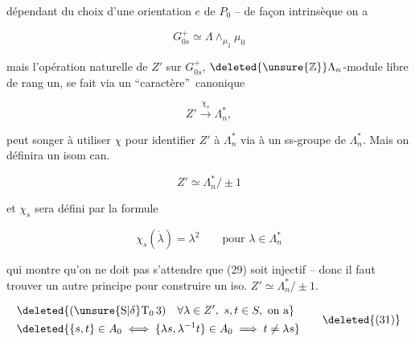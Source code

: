 
dépendant du choix d'une orientation $e$ de $P_0$ -- de façon intrinsèque on a

\[
G_{0s}^+\simeq\Lambda\wedge_{\mu_2}\mu_0\tag*{(28)}
\]


mais l'opération naturelle de $Z'$ sur $G_{0s}^+$, $\deleted{\unsure{\mathbb Z}}\Lambda_n$-module libre de rang un, se fait via un ``caractère''\ canonique

\[
Z'\xrightarrow{\chi_s}\Lambda_n^*,\tag*{(29)}
\]

 peut songer à utiliser $\chi$ pour identifier $Z'$ à $\Lambda_n^*$ via à un ss-groupe de $\Lambda_n^*$. Mais  on définira un isom can.

\[
Z'\simeq\Lambda_n^*/\pm1
\]

et $\chi_s$ sera défini par la formule

\[
\chi_s(\dot\lambda)=\lambda^2\qquad\text{pour }\lambda\in\Lambda_n^*\tag*{(30)}
\]


qui montre qu'on ne doit pas s'attendre que (29) soit injectif -- donc il faut trouver un autre principe pour construire un iso. $Z'\simeq\Lambda_n^*/\pm1$.


\[
\begin{aligned}
 &\deleted{(\unsure{\mathrm S|\delta}\mathrm T_0\,3)\quad\forall\lambda\in Z',\ s,t\in S,\ \text{on a}}\\
 &\deleted{\{s,t\}\in A_0\iff\{\lambda s,\lambda^{-1}t\}\in A_0\implies t\ne\lambda s}
\end{aligned}\tag*{\deleted{(31)}}
\]
